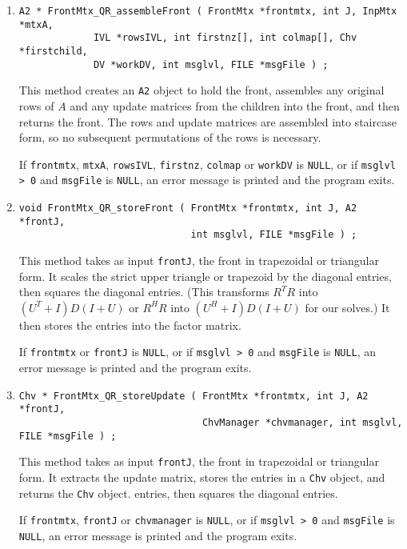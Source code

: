 \begin{enumerate}
\item
\begin{verbatim}
A2 * FrontMtx_QR_assembleFront ( FrontMtx *frontmtx, int J, InpMtx *mtxA, 
             IVL *rowsIVL, int firstnz[], int colmap[], Chv *firstchild,
             DV *workDV, int msglvl, FILE *msgFile ) ;
\end{verbatim}
This method creates an {\tt A2} object to hold the front,
assembles any original rows of $A$ and any update
matrices from the children into the front,
and then returns the front.
The rows and update matrices are assembled into staircase form,
so no subsequent permutations of the rows is necessary.
\par {}
If {\tt frontmtx}, {\tt mtxA}, {\tt rowsIVL}, {\tt firstnz},
{\tt colmap} or {\tt workDV} is {\tt NULL},
or if {\tt msglvl > 0} and {\tt msgFile} is {\tt NULL},
an error message is printed and the program exits.
\item
\begin{verbatim}
void FrontMtx_QR_storeFront ( FrontMtx *frontmtx, int J, A2 *frontJ,
                              int msglvl, FILE *msgFile ) ;
\end{verbatim}
This method takes as input {\tt frontJ}, the front in trapezoidal
or triangular form.
It scales the strict upper triangle or trapezoid by the diagonal
entries, then squares the diagonal entries.
(This transforms $R^TR$ into $(U^T + I)D(I+U)$
or $R^HR$ into $(U^H + I)D(I+U)$ for our solves.)
It then stores the entries into the factor matrix.
\par {}
If {\tt frontmtx} or {\tt frontJ} is {\tt NULL},
or if {\tt msglvl > 0} and {\tt msgFile} is {\tt NULL},
an error message is printed and the program exits.
\item
\begin{verbatim}
Chv * FrontMtx_QR_storeUpdate ( FrontMtx *frontmtx, int J, A2 *frontJ,
                                ChvManager *chvmanager, int msglvl, FILE *msgFile ) ;
\end{verbatim}
This method takes as input {\tt frontJ}, the front in trapezoidal
or triangular form.
It extracts the update matrix, stores the entries in a {\tt Chv} object,
and returns the {\tt Chv} object.
entries, then squares the diagonal entries.
\par {}
If {\tt frontmtx}, {\tt frontJ} or {\tt chvmanager} is {\tt NULL},
or if {\tt msglvl > 0} and {\tt msgFile} is {\tt NULL},
an error message is printed and the program exits.
\end{enumerate}
\par
